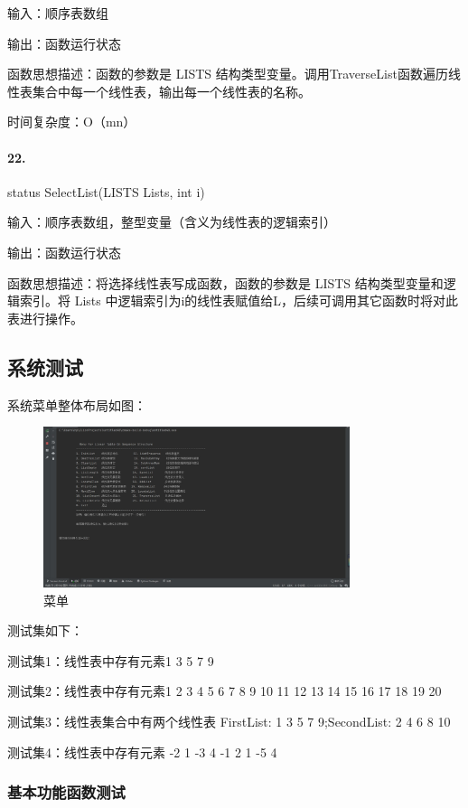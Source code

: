 \documentclass[supercite]{Experimental_Report}
\theoremstyle{definition}
\begin{document}
输入：顺序表数组

输出：函数运行状态

函数思想描述：函数的参数是 LISTS 结构类型变量。调用TraverseList函数遍历线性表集合中每一个线性表，输出每一个线性表的名称。

时间复杂度：O（mn）

\paragraph{22.}status SelectList(LISTS Lists, int i)

输入：顺序表数组，整型变量（含义为线性表的逻辑索引）

输出：函数运行状态

函数思想描述：将选择线性表写成函数，函数的参数是 LISTS 结构类型变量和逻辑索引。将 Lists 中逻辑索引为i的线性表赋值给L，后续可调用其它函数时将对此表进行操作。

\subsection{系统测试}

系统菜单整体布局如图：

 \begin{figure}[H]
 	\centering
 	\includegraphics[width=0.8\textwidth]{images/菜单.jpg}
 	\caption{菜单}
 	\label{txlab}
 \end{figure}

测试集如下：

测试集1：线性表中存有元素1 3 5 7 9

测试集2：线性表中存有元素1 2 3 4 5 6 7 8 9 10 11 12 13 14 15 16 17 18 19 20

测试集3：线性表集合中有两个线性表 FirstList: 1 3 5 7 9;SecondList: 2 4 6 8 10

测试集4：线性表中存有元素 -2 1 -3 4 -1 2 1 -5 4

\setcounter{paragraph}{0}

\subsubsection{基本功能函数测试}
\end{document}
